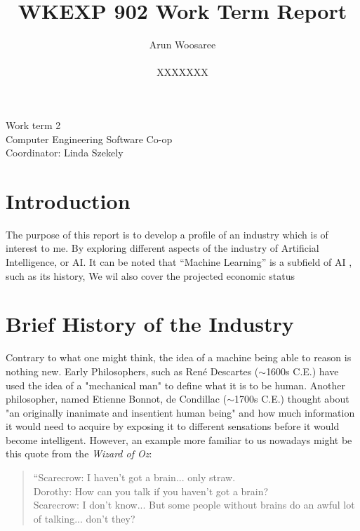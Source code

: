 \documentclass[letterpaper,12pt]{article}
\title{WKEXP 902 Work Term Report}
\author{Arun Woosaree \\ \\ XXXXXXX}
\begin{document}
\relax
\begin{titlepage}
 \maketitle
 \thispagestyle{empty} %
 \centering
 \large
 \vspace{1cm}
 Work term 2\\
 \vspace{1cm}
 Computer Engineering Software Co-op \\
 \vspace{1cm}
 Coordinator: Linda Szekely
\end{titlepage}

\section{Introduction}
The purpose of this report is to develop a profile of an industry which is of interest to me.
By exploring different aspects of the industry of Artificial Intelligence, or AI.
It can be noted that ``Machine Learning'' is a subfield of AI \cite{sasAIvsML} , such as its history, 
We wil also cover the projected economic status 

\section{Brief History of the Industry}
Contrary to what one might think, the idea of a machine being able to reason is nothing new. 
Early Philosophers, such as René Descartes ($\sim$1600s C.E.) have used the idea of a "mechanical man"
to define what it is to be human.\cite{briefhistory}\cite{sep-descartes}
Another philosopher, named Etienne Bonnot, de Condillac\cite{briefhistory} ($\sim$1700s C.E.)
thought about "an originally inanimate and insentient human being"\cite{sep-condillac}
and how much information it would need to acquire by exposing it to different sensations
before it would become intelligent. However, an example more familiar to us nowadays
might be this quote from the \textit{Wizard of Oz}\cite{wizardofoz}:
\begin{quotation}
    \noindent“Scarecrow: I haven't got a brain... only straw.\\
    Dorothy: How can you talk if you haven't got a brain?\\
    Scarecrow: I don't know... But some people without brains do an awful lot of talking... don't they?\\
\end{quotation}
\end{document}
